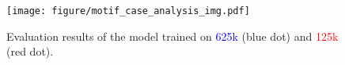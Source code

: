 \begin{figure}[h]

    \vspace{-12mm}
    \centering
    \texttt{[image: figure/motif\_case\_analysis\_img.pdf]}
    \vspace{-2mm}
    \caption{Evaluation results of the model trained on \textcolor{blue}{625k} (blue dot) and \textcolor{red}{125k} (red dot).}
    \vspace{-3mm}
    \label{fig: motif case}
\end{figure}
